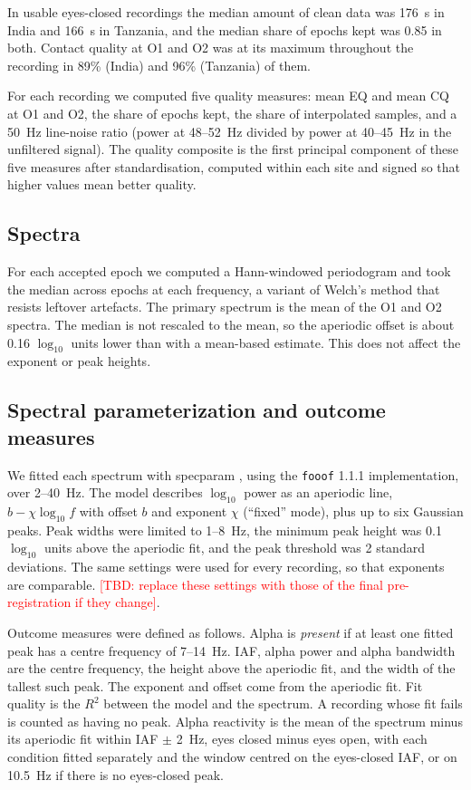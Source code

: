 \documentclass[11pt,a4paper]{article}
\newcommand{\TBD}[1]{\textcolor{red}{[TBD: #1]}}
\begin{document}
In usable eyes-closed recordings the median amount of clean data was 176~s in India and
166~s in Tanzania, and the median share of epochs kept was 0.85 in both. Contact quality
at O1 and O2 was at its maximum throughout the recording in 89\% (India) and 96\%
(Tanzania) of them.

For each recording we computed five quality measures: mean EQ and mean CQ at O1 and O2,
the share of epochs kept, the share of interpolated samples, and a 50~Hz line-noise ratio
(power at 48--52~Hz divided by power at 40--45~Hz in the unfiltered signal). The quality
composite is the first principal component of these five measures after standardisation,
computed within each site and signed so that higher values mean better quality.

\subsection{Spectra}

For each accepted epoch we computed a Hann-windowed periodogram and took the median across
epochs at each frequency, a variant of Welch's method \citep{welch1967} that resists
leftover artefacts. The primary spectrum is the mean of the O1 and O2 spectra. The median
is not rescaled to the mean, so the aperiodic offset is about 0.16 $\log_{10}$ units lower
than with a mean-based estimate. This does not affect the exponent or peak heights.

\subsection{Spectral parameterization and outcome measures}

We fitted each spectrum with specparam \citep{donoghue2020}, using the \texttt{fooof}
1.1.1 implementation, over 2--40~Hz. The model describes $\log_{10}$ power as an aperiodic
line, $b - \chi \log_{10} f$ with offset $b$ and exponent $\chi$ (``fixed'' mode), plus up
to six Gaussian peaks. Peak widths were limited to 1--8~Hz, the minimum peak height was 0.1
$\log_{10}$ units above the aperiodic fit, and the peak threshold was 2 standard deviations.
The same settings were used for every recording, so that exponents are comparable.
\TBD{replace these settings with those of the final pre-registration if they change}.

Outcome measures were defined as follows. Alpha is \emph{present} if at least one fitted
peak has a centre frequency of 7--14~Hz. IAF, alpha power and alpha bandwidth are the
centre frequency, the height above the aperiodic fit, and the width of the tallest such
peak. The exponent and offset come from the aperiodic fit. Fit quality is the $R^2$ between
the model and the spectrum. A recording whose fit fails is counted as having no peak.
Alpha reactivity is the mean of the spectrum minus its aperiodic fit within IAF $\pm$ 2~Hz,
eyes closed minus eyes open, with each condition fitted separately and the window centred
on the eyes-closed IAF, or on 10.5~Hz if there is no eyes-closed peak.
\end{document}
